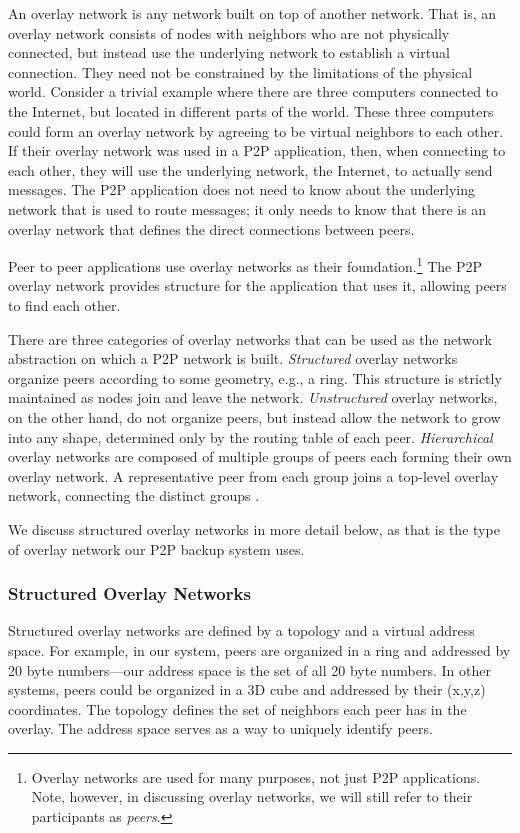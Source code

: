\documentclass[12pt]{report}
\begin{document}
An overlay network is any network built on top of another network. That is, an overlay network consists of nodes with neighbors who are not physically connected, but instead use the underlying network to establish a virtual connection. They need not be constrained by the limitations of the physical world. Consider a trivial example where there are three computers connected to the Internet, but located in different parts of the world. These three computers could form an overlay network by agreeing to be virtual neighbors to each other. If their overlay network was used in a P2P application, then, when connecting to each other, they will use the underlying network, the Internet, to actually send messages. The P2P application does not need to know about the underlying network that is used to route messages; it only needs to know that there is an overlay network that defines the direct connections between peers.

Peer to peer applications use overlay networks as their foundation.\footnote{Overlay networks are used for many purposes, not just P2P applications. Note, however, in discussing overlay networks, we will still refer to their participants as \textit{peers}.}  The P2P overlay network provides structure for the application that uses it, allowing peers to find each other.

There are three categories of overlay networks that can be used as the network abstraction on which a P2P network is built. \textit{Structured} overlay networks organize peers according to some geometry, e.g., a ring. This structure is strictly maintained as nodes join and leave the network. \textit{Unstructured} overlay networks, on the other hand, do not organize peers, but instead allow the network to grow into any shape, determined only by the routing table of each peer. \textit{Hierarchical} overlay networks are composed of multiple groups of peers each forming their own overlay network. A representative peer from each group joins a top-level overlay network, connecting the distinct groups \cite{p2pSurvey}.

We discuss structured overlay networks in more detail below, as that is the type of overlay network our P2P backup system uses.

\subsubsection{Structured Overlay Networks} \label{subsubsec:StructuredOverlayNetworks}

Structured overlay networks are defined by a topology and a virtual address space. For example, in our system, peers are organized in a ring and addressed by 20 byte numbers---our address space is the set of all 20 byte numbers. In other systems, peers could be organized in a 3D cube and addressed by their (x,y,z) coordinates. The topology defines the set of neighbors each peer has in the overlay. The address space serves as a way to uniquely identify peers.
\end{document}

